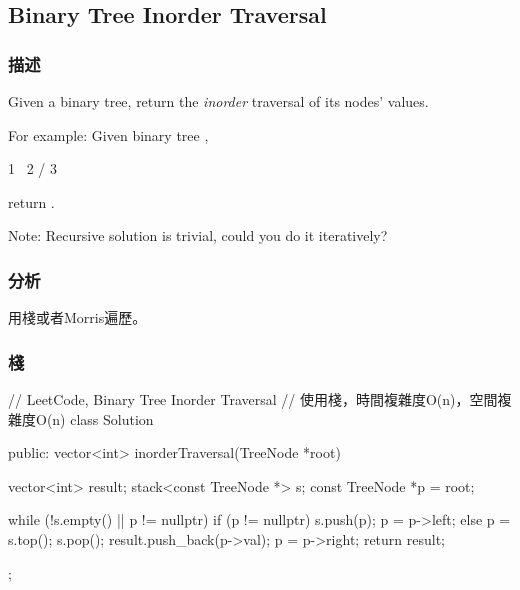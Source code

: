 \subsection{Binary Tree Inorder Traversal}
\label{sec:binary-tree-inorder-traversal}


\subsubsection{描述}
Given a binary tree, return the \emph{inorder} traversal of its nodes' values.

For example:
Given binary tree ,
\begin{Code}
 1
  \
   2
  /
 3
\end{Code}
return \code{\[1,3,2\]}.

Note: Recursive solution is trivial, could you do it iteratively?


\subsubsection{分析}
用棧或者Morris遍歷。


\subsubsection{棧}
\begin{Code}
// LeetCode, Binary Tree Inorder Traversal
// 使用棧，時間複雜度O(n)，空間複雜度O(n)
class Solution {
public:
    vector<int> inorderTraversal(TreeNode *root) {
        vector<int> result;
        stack<const TreeNode *> s;
        const TreeNode *p = root;

        while (!s.empty() || p != nullptr) {
            if (p != nullptr) {
                s.push(p);
                p = p->left;
            } else {
                p = s.top();
                s.pop();
                result.push_back(p->val);
                p = p->right;
            }
        }
        return result;
    }
};
\end{Code}


